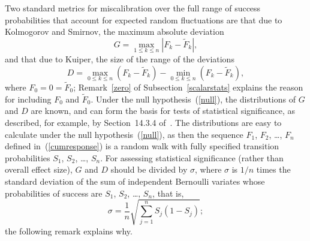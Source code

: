 \documentclass{article}
\begin{document}
Two standard metrics for miscalibration over the full range
of success probabilities that account for expected random fluctuations
are that due to Kolmogorov and Smirnov, the maximum absolute deviation
%
\begin{equation}
\label{aKolmogorov-Smirnov}
G = \max_{1 \le k \le n} |F_k-\tilde{F}_k|,
\end{equation}
%
and that due to Kuiper, the size of the range of the deviations
%
\begin{equation}
\label{aKuiper}
D = \max_{0 \le k \le n} (F_k-\tilde{F}_k)
  - \min_{0 \le k \le n} (F_k-\tilde{F}_k),
\end{equation}
%
where $F_0 = 0 = \tilde{F}_0$; Remark~\ref{zero}
of Subsection~\ref{scalarstats}
explains the reason for including $F_0$ and $\tilde{F}_0$.
Under the null hypothesis~(\ref{null}),
the distributions of $G$ and $D$ are known,
and can form the basis for tests of statistical significance,
as described, for example,
by Section~14.3.4 of~\cite{press-teukolsky-vetterling-flannery}.
The distributions are easy to calculate under the null hypothesis~(\ref{null}),
as then the sequence $F_1$, $F_2$, \dots, $F_n$ defined in~(\ref{cumresponse})
is a random walk with fully specified transition probabilities
$S_1$, $S_2$, \dots, $S_n$.
For assessing statistical significance (rather than overall effect size),
$G$ and $D$ should be divided by $\sigma$,
where $\sigma$ is $1/n$ times the standard deviation
of the sum of independent Bernoulli variates whose probabilities of success
are $S_1$, $S_2$, \dots, $S_n$, that is,
%
\begin{equation}
\label{astddev}
\sigma = \frac{1}{n} \sqrt{\sum_{j=1}^n S_j (1-S_j)};
\end{equation}
%
the following remark explains why.
\end{document}
